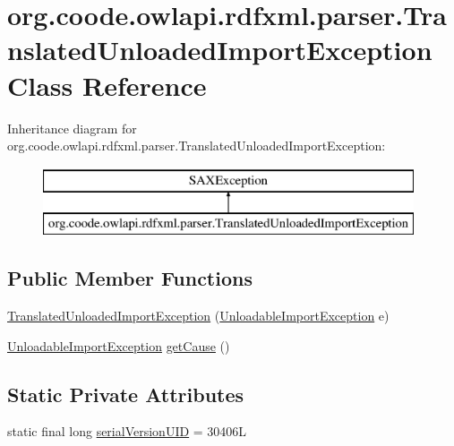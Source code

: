 \hypertarget{classorg_1_1coode_1_1owlapi_1_1rdfxml_1_1parser_1_1_translated_unloaded_import_exception}{\section{org.\-coode.\-owlapi.\-rdfxml.\-parser.\-Translated\-Unloaded\-Import\-Exception Class Reference}
\label{classorg_1_1coode_1_1owlapi_1_1rdfxml_1_1parser_1_1_translated_unloaded_import_exception}
}
Inheritance diagram for org.\-coode.\-owlapi.\-rdfxml.\-parser.\-Translated\-Unloaded\-Import\-Exception\-:\begin{figure}[H]
\begin{center}
\leavevmode
\includegraphics[height=2.000000cm]{classorg_1_1coode_1_1owlapi_1_1rdfxml_1_1parser_1_1_translated_unloaded_import_exception}
\end{center}
\end{figure}
\subsection*{Public Member Functions}
\begin{DoxyCompactItemize}
\item 
\hyperlink{classorg_1_1coode_1_1owlapi_1_1rdfxml_1_1parser_1_1_translated_unloaded_import_exception_a77a612f1572352c284d6cf1fcc6ab3f4}{Translated\-Unloaded\-Import\-Exception} (\hyperlink{classorg_1_1semanticweb_1_1owlapi_1_1model_1_1_unloadable_import_exception}{Unloadable\-Import\-Exception} e)
\item 
\hyperlink{classorg_1_1semanticweb_1_1owlapi_1_1model_1_1_unloadable_import_exception}{Unloadable\-Import\-Exception} \hyperlink{classorg_1_1coode_1_1owlapi_1_1rdfxml_1_1parser_1_1_translated_unloaded_import_exception_ad7c13ce046f5edd397b4618aec7478cb}{get\-Cause} ()
\end{DoxyCompactItemize}
\subsection*{Static Private Attributes}
\begin{DoxyCompactItemize}
\item 
static final long \hyperlink{classorg_1_1coode_1_1owlapi_1_1rdfxml_1_1parser_1_1_translated_unloaded_import_exception_a7c393c619aea05535ad14254eaaa68db}{serial\-Version\-U\-I\-D} = 30406\-L
\end{DoxyCompactItemize}


